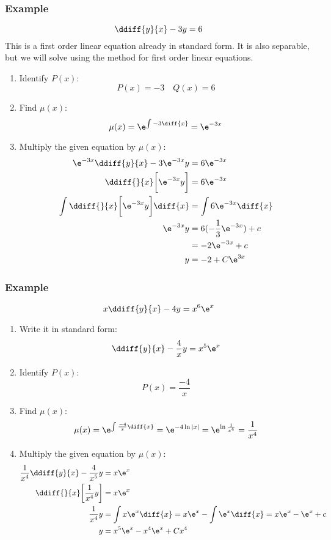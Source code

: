 \documentclass{math}
\begin{document}
\subsubsection*{Example}
\[ \ddiff{y}{x}-3y = 6 \]
This is a first order linear equation already in standard form. It is also
separable, but we will solve using the method for first order linear equations.
\begin{enumerate}
  \item Identify \( P(x) \):
  \[ P(x) = -3 \quad Q(x) = 6 \]
  \item Find \( \mu(x) \):
  \[ \mu(x) = \e^{\int-3\diff{x}} = \e^{-3x} \]
  \item Multiply the given equation by \( \mu(x) \):
  \begin{align*}
    \e^{-3x}\ddiff{y}{x}-3\e^{-3x}y &= 6\e^{-3x} \\
    \ddiff{}{x}\bigg[\e^{-3x}y\bigg] &= 6\e^{-3x} \\
    \int\ddiff{}{x}\bigg[\e^{-3x}y\bigg]\diff{x} &= \int 6\e^{-3x}\diff{x} \\
    \e^{-3x}y &= 6(-\frac{1}{3}\e^{-3x})+c \\
    &= -2\e^{-3x}+c \\
    y &= -2+C\e^{3x}
  \end{align*}
\end{enumerate}

\subsubsection*{Example}
\[ x\ddiff{y}{x}-4y = x^6\e^x \]
\begin{enumerate}
  \item Write it in standard form:
  \[ \ddiff{y}{x}-\frac{4}{x}y = x^5\e^x \]
  \item Identify \( P(x) \):
  \[ P(x) = \frac{-4}{x} \]
  \item Find \( \mu(x) \):
  \[ \mu(x) = \e^{\int\frac{-4}{x}\diff{x}} = \e^{-4\ln|x|} =
    \e^{\ln\frac{1}{x^4}} = \frac{1}{x^4} \]
  \item Multiply the given equation by \( \mu(x) \):
  \begin{align*}
    \frac{1}{x^4}\ddiff{y}{x}-\frac{4}{x^5}y &= x\e^x \\
    \ddiff{}{x}\bigg[\frac{1}{x^4}y\bigg] &= x\e^x \\
    \frac{1}{x^4}y &= \int x\e^x\diff{x}
      = x\e^x-\int\e^x\diff{x}
      = x\e^x-\e^x+c \\
    y &= x^5\e^x-x^4\e^x+Cx^4
  \end{align*}
\end{enumerate}
\end{document}
